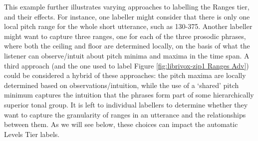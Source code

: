 \documentclass[11pt, twoside]{memoir}
\begin{document}
This example further illustrates varying approaches to labelling the Ranges tier, and their effects. For instance, one labeller might consider that there is only one local pitch range for the whole short utterance, such as 130-375. Another labeller might want to capture three ranges, one for each of the three prosodic phrases, where both the ceiling and floor are determined locally, on the basis of what the listener can observe\slash intuit about pitch minima and maxima in the time span. A third approach (and the one used to label Figure \ref{fig:librivox-zip1 Ranges Adv}) could be considered a hybrid of these approaches: the pitch maxima are locally determined based on observations\slash intuition, while the use of a ‘shared’ pitch minimum captures the intuition that the phrases form part of some hierarchically superior tonal group. It is left to individual labellers to determine whether they want to capture the granularity of ranges in an utterance and the relationships between them. As we will see below, these choices can impact the automatic Levels Tier labels.
\end{document}
